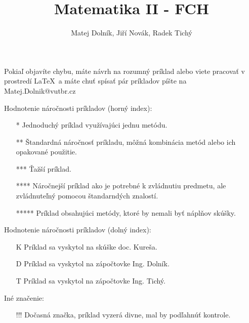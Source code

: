 \author{Matej Dolník, Jiří Novák, Radek Tichý}
\title{Matematika II - FCH}
\maketitle
Pokiaľ objavíte chybu, máte návrh na rozumný príklad alebo viete pracovať v prostredí \LaTeX~a máte chuť spísať pár príkladov píšte na \newline Matej.Dolnik@vutbr.cz 

Hodnotenie náročnosti príkladov (horný index):
\begin{enumerate}
    \item [*] Jednoduchý príklad využívajúci jednu metódu.
    \item [**] Štandardná náročnosť príkladu, môžná kombinácia metód alebo ich opakované použitie. 
    \item [***] Ťažší príklad.
    \item [****] Náročnejší príklad ako je potrebné k zvládnutiu predmetu, ale zvládnuteľný pomocou štandarndých znalostí.
    \item [*****] Príklad obsahujúci metódy, ktoré by nemali byť náplňov skúšky.
\end{enumerate}
Hodnotenie náročnosti príkladov (dolný index):

\begin{enumerate}
    \item [K] Príklad sa vyskytol na skúške doc. Kureša.
    \item [D] Príklad sa vyskytol na zápočtovke Ing. Dolník.
    \item [T] Príklad sa vyskytol na zápočtovke Ing. Tichý.
\end{enumerate}

Iné značenie:
\begin{enumerate}
    \item [!!!] Dočasná značka, príklad vyzerá divne, mal by podľahnúť kontrole.
\end{enumerate}